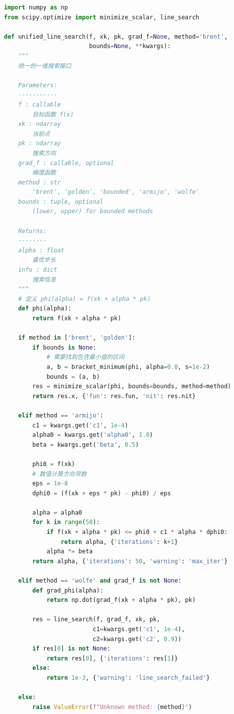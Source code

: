 \begin{lstlisting}[language=Python, caption=统一一维搜索接口]
import numpy as np
from scipy.optimize import minimize_scalar, line_search

def unified_line_search(f, xk, pk, grad_f=None, method='brent', 
                        bounds=None, **kwargs):
    """
    统一的一维搜索接口
    
    Parameters:
    -----------
    f : callable
        目标函数 f(x)
    xk : ndarray
        当前点
    pk : ndarray
        搜索方向
    grad_f : callable, optional
        梯度函数
    method : str
        'brent', 'golden', 'bounded', 'armijo', 'wolfe'
    bounds : tuple, optional
        (lower, upper) for bounded methods
    
    Returns:
    --------
    alpha : float
        最优步长
    info : dict
        搜索信息
    """
    # 定义 phi(alpha) = f(xk + alpha * pk)
    def phi(alpha):
        return f(xk + alpha * pk)
    
    if method in ['brent', 'golden']:
        if bounds is None:
            # 需要找到包含最小值的区间
            a, b = bracket_minimum(phi, alpha=0.0, s=1e-2)
            bounds = (a, b)
        res = minimize_scalar(phi, bounds=bounds, method=method)
        return res.x, {'fun': res.fun, 'nit': res.nit}
    
    elif method == 'armijo':
        c1 = kwargs.get('c1', 1e-4)
        alpha0 = kwargs.get('alpha0', 1.0)
        beta = kwargs.get('beta', 0.5)
        
        phi0 = f(xk)
        # 数值计算方向导数
        eps = 1e-8
        dphi0 = (f(xk + eps * pk) - phi0) / eps
        
        alpha = alpha0
        for k in range(50):
            if f(xk + alpha * pk) <= phi0 + c1 * alpha * dphi0:
                return alpha, {'iterations': k+1}
            alpha *= beta
        return alpha, {'iterations': 50, 'warning': 'max_iter'}
    
    elif method == 'wolfe' and grad_f is not None:
        def grad_phi(alpha):
            return np.dot(grad_f(xk + alpha * pk), pk)
        
        res = line_search(f, grad_f, xk, pk,
                         c1=kwargs.get('c1', 1e-4),
                         c2=kwargs.get('c2', 0.9))
        if res[0] is not None:
            return res[0], {'iterations': res[1]}
        else:
            return 1e-3, {'warning': 'line_search_failed'}
    
    else:
        raise ValueError(f"Unknown method: {method}")



\end{lstlisting}
